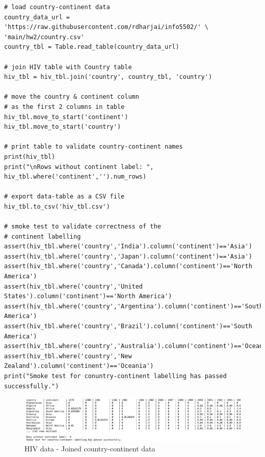 \documentclass[UTF8, letter]{article}
\begin{document}
\begin{codeblock}
\begin{verbatim}
# load country-continent data
country_data_url = 'https://raw.githubusercontent.com/rdharjai/info5502/' \
'main/hw2/country.csv'
country_tbl = Table.read_table(country_data_url)

# join HIV table with Country table
hiv_tbl = hiv_tbl.join('country', country_tbl, 'country')

# move the country & continent column 
# as the first 2 columns in table
hiv_tbl.move_to_start('continent')
hiv_tbl.move_to_start('country')

# print table to validate country-continent names
print(hiv_tbl)
print("\nRows without continent label: ", hiv_tbl.where('continent','').num_rows)

# export data-table as a CSV file 
hiv_tbl.to_csv('hiv_tbl.csv')

# smoke test to validate correctness of the 
# continent labelling
assert(hiv_tbl.where('country','India').column('continent')=='Asia')
assert(hiv_tbl.where('country','Japan').column('continent')=='Asia')
assert(hiv_tbl.where('country','Canada').column('continent')=='North America')
assert(hiv_tbl.where('country','United States').column('continent')=='North America')
assert(hiv_tbl.where('country','Argentina').column('continent')=='South America')
assert(hiv_tbl.where('country','Brazil').column('continent')=='South America')
assert(hiv_tbl.where('country','Australia').column('continent')=='Oceania')
assert(hiv_tbl.where('country','New Zealand').column('continent')=='Oceania')
print("Smoke test for conuntry-continent labelling has passed successfully.")
\end{verbatim}
\end{codeblock}

\begin{figure}[h!]
	\centering
	\includegraphics[width=\linewidth]{output_4.png}
	\caption{HIV data - Joined country-continent data}
	\label{fig:boat1}
\end{figure}

\pagebreak
\end{document}
